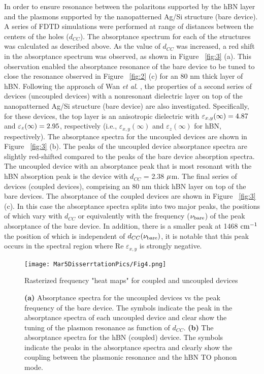 \documentclass[
reprint,
amsmath,amssymb,
aip,
jap,
floatfix,
]{revtex4-2}
\begin{document}
    In order to ensure resonance between the polaritons supported by the hBN layer and the plasmons supported by the nanopatterned Ag/Si structure (bare device). A series of FDTD simulations were performed at range of distances between the centers of the holes ($d_{CC}$). The absorptance spectrum for each of the structures was calculated as described above. As the value of $d_{CC}$ was increased, a red shift in the absorptance spectrum was observed, as shown in Figure ~\ref{fig:3} (a). This observation enabled the absorptance resonance of the bare device to be tuned to close the resonance observed in Figure ~\ref{fig:2} (c) for an 80 nm thick layer of hBN. Following the approach of Wan \textit{et al}. \cite{Wan:16}, the properties of a second series of devices (uncoupled devices) with a nonresonant dielectric layer on top of the nanopatterned Ag/Si structure (bare device) are also investigated. Specifically, for these devices, the top layer is an anisotropic dielectric with $\varepsilon_{x,y}(\infty)= \rm{4.87}$ and $\varepsilon_{z}(\infty)= \rm{2.95}$, respectively (i.e., $\varepsilon_{x,y}(\infty)$ and $\varepsilon_{z}(\infty)$ for hBN, respectively). The absorptance spectra for the uncoupled devices are shown in Figure ~\ref{fig:3} (b). The peaks of the uncoupled device absorptance spectra are slightly red-shifted compared to the peaks of the bare device absorption spectra. The uncoupled device with an absorptance peak that is most resonant with the hBN absorption peak is the device with $d_{CC}$ = 2.38 $\rm \mu$m. The final series of devices (coupled devices), comprising an 80 nm thick hBN layer on top of the bare devices. The absorptance of the coupled devices are shown in Figure  ~\ref{fig:3} (c). In this case the absorptance spectra splits into two major peaks, the positions of which vary with $d_{CC}$ or equivalently with the frequency ($\nu_{\rm{bare}}$) of the peak absorptance of the bare device. In addition, there is a smaller peak at 1468 $\rm cm^{-1}$ the position of which is independent of $d_{CC}(\nu_{\rm{bare}})$, it is notable that this peak occurs in the spectral region where Re $\varepsilon_{x,y}$ is strongly negative.

      \begin{figure}[!htb]
        \centering\texttt{[image: Mar5DisserrtationPics/Fig4.png]}
        \caption{Rasterized frequency "heat maps" for coupled and uncoupled devices}
        \caption*{\textbf{(a)} Absorptance spectra for the uncoupled devices vs the peak frequency of the bare device. The symbols indicate the peak in the absorptance spectra of each uncoupled device and clear show the tuning of the plasmon resonance as function of $d_{CC}$. \textbf{(b)} The absorptance spectra for the hBN (coupled) device. The symbols indicate the peaks in the absorptance spectra and clearly show the coupling between the plasmonic resonance and the hBN TO phonon mode.}
        \label{fig:4}
      \end{figure}
\end{document}
